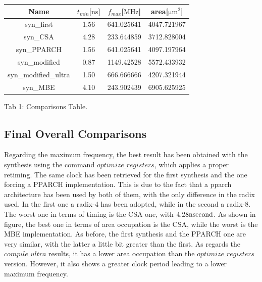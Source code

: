 \begin{center}
    \begin{tabular}{ |c|c|c|c| } 
        \hline
            Name & $t_{min}$[$\si{\nano\second}$] & $f_{max}$[$\si{\mega\hertz}$] & area[$\si{\micro\meter}^{2}$]\\
            \hline
            syn\_first & 1.56 & 641.025641 & 4047.721967\\
            \hline
            syn\_CSA & 4.28 & 233.644859 & 3712.828004\\
            \hline
            syn\_PPARCH & 1.56 & 641.025641 & 4097.197964\\
            \hline
            syn\_modified & 0.87 & 1149.42528 & 5572.433932\\
            \hline
            syn\_modified\_ultra & 1.50 & 666.666666 & 4207.321944\\
            \hline
            syn\_MBE & 4.10 & 243.902439 & 6905.625925\\
        	\hline
    \end{tabular}
    \begin{center}
    	Tab 1: Comparisons Table.
    \end{center}
\end{center}


\subsection{Final Overall Comparisons}

Regarding the maximum frequency, the best result has been obtained with the synthesis using the command $optimize\_registers$, which applies a proper retiming. The same clock has been retrieved for the first synthesis and the one forcing a PPARCH implementation. This is due to the fact that a pparch architecture has been used by both of them, with the only difference in the radix used. In the first one a radix-4 has been adopted, while in the second a radix-8. The worst one in terms of timing is the CSA one, with $4.28\si{\nano\\second}$.
As shown in figure, the best one in terms of area occupation is the CSA, while the worst is the MBE implementation. As before, the first synthesis and the PPARCH one are very similar, with the latter a little bit greater than the first. As regards the $compile\_ultra$ results, it has a lower area occupation than the $optimize\_registers$ version. However, it also shows a greater clock period leading to a lower maximum frequency.